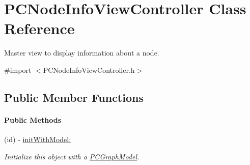 \hypertarget{interface_p_c_node_info_view_controller}{
\section{PCNodeInfoViewController Class Reference}
\label{interface_p_c_node_info_view_controller}
}


Master view to display information about a node.  




{\ttfamily \#import $<$PCNodeInfoViewController.h$>$}

\subsection*{Public Member Functions}
\begin{Indent}\paragraph*{Public Methods}
\begin{DoxyCompactItemize}
\item 
\hypertarget{interface_p_c_node_info_view_controller_ac15da8a7d16bd663a5b0751fad03aeca}{
(id) -\/ \hyperlink{interface_p_c_node_info_view_controller_ac15da8a7d16bd663a5b0751fad03aeca}{initWithModel:}}
\label{interface_p_c_node_info_view_controller_ac15da8a7d16bd663a5b0751fad03aeca}

\begin{DoxyCompactList}\small\item\em Initialize this object with a \hyperlink{interface_p_c_graph_model}{PCGraphModel}. \end{DoxyCompactList}\end{DoxyCompactItemize}
\end{Indent}
